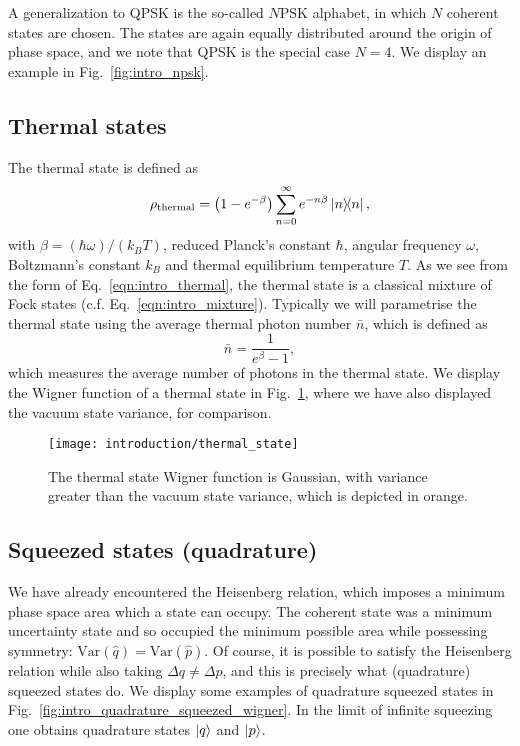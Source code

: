 A generalization to QPSK is the so-called $N$PSK alphabet, in which $N$ coherent states are chosen. The states are again equally distributed around the origin of phase space, and we note that QPSK is the special case $N=4$. We display an example in Fig.~\ref{fig:intro_npsk}.



\FloatBarrier
\subsection{Thermal states}\label{sec:intro_thermal}

The thermal state is defined as
\begin{equation}\label{eqn:intro_thermal}
\rho_{\text{thermal}} = \left( 1 - e^{-\beta} \right) \sum_{n=0}^\infty e^{- n \beta} \dyad{n},
\end{equation}
with $\beta = \left( \hbar \omega \right)/\left(k_B T\right)$, reduced Planck's constant $\hbar$, angular frequency $\omega$, Boltzmann's constant $k_B$ and thermal equilibrium temperature $T$. As we see from the form of Eq.~\ref{eqn:intro_thermal}, the thermal state is a classical mixture of Fock states (c.f. Eq.~\ref{eqn:intro_mixture}). Typically we will parametrise the thermal state using the average thermal photon number $\bar{n}$, which is defined as 
\begin{equation}
\bar{n} = \frac{1}{e^\beta - 1},
\end{equation}
which measures the average number of photons in the thermal state. We display the Wigner function of a thermal state in Fig.~\ref{fig:thermal_state}, where we have also displayed the vacuum state variance, for comparison.


\begin{figure}[htp]
\captionsetup{width=0.8\linewidth}
\centering
\texttt{[image: introduction/thermal\_state]}
\caption{\label{fig:thermal_state} The thermal state Wigner function is Gaussian, with variance greater than the vacuum state variance, which is depicted in orange.}
\end{figure}

\FloatBarrier
\subsection{Squeezed states (quadrature)}

We have already encountered the Heisenberg relation, which imposes a minimum phase space area which a state can occupy. The coherent state was a minimum uncertainty state and so occupied the minimum possible area while possessing symmetry: $\text{Var}\left( \hat{q}\right) = \text{Var}\left(\hat{p}\right)$. Of course, it is possible to satisfy the Heisenberg relation while also taking $\Delta q \ne \Delta p$, and this is precisely what (quadrature) squeezed states do. We display some examples of quadrature squeezed states in Fig.~\ref{fig:intro_quadrature_squeezed_wigner}. In the limit of infinite squeezing one obtains quadrature states $\ket{q}$ and $\ket{p}$.

